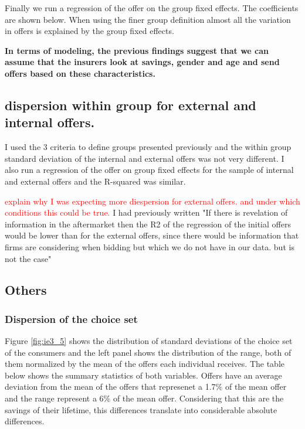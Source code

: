 \documentclass[12pt]{article}
\begin{document}
Finally we run a regression of the offer on the group fixed effects. The coefficients are shown below. When using the finer group definition almost all the variation in offers is explained by the group fixed effects. 

\textbf{In terms of modeling, the previous findings suggest that we can assume that the insurers look at savings, gender and age and send offers based on these characteristics. }




\subsection{dispersion within group for external and internal offers. }

I used the 3 criteria to define groups presented previously and the within group standard deviation of the internal and external offers was not very different. I also run a regression of the offer on group fixed effects for the sample of internal and external offers and the R-squared was similar. 


\textcolor{red}{explain why I was expecting more diespersion for external offers.   and under which conditions this could be true. }
I had previously written "If there is revelation of information in the aftermarket then the R2 of the regression of the initial offers would be lower than for the external offers, since there would be information that firms are considering when bidding but which we do not have in our data. but is not the case"

\subsection{Others}

\subsubsection{Dispersion of the choice set}
Figure \ref{fig:ie3_5} shows the distribution of standard deviations of the choice set of the consumers and the left panel shows the distribution of the range, both of them normalized by the mean of the offers each individual receives.  The table below shows the summary statistics of both variables. Offers have an average deviation from the mean of the offers that represenet a 1.7\% of the mean offer and the range represent a 6\% of the mean offer. Considering that this are the savings of their lifetime, this differences translate into considerable absolute differences.
\end{document}
